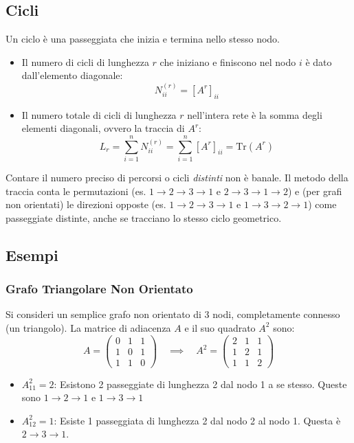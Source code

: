 	\subsection{Cicli}
	Un ciclo è una passeggiata che inizia e termina nello stesso nodo.
	\begin{itemize}
		\item Il numero di cicli di lunghezza $r$ che iniziano e finiscono nel nodo $i$ è dato dall'elemento diagonale:
		$$N_{ii}^{(r)} = [A^r]_{ii}$$
		
		\item Il numero totale di cicli di lunghezza $r$ nell'intera rete è la somma degli elementi diagonali, ovvero la traccia di $A^r$:
		$$L_r = \sum_{i=1}^{n} N_{ii}^{(r)} = \sum_{i=1}^{n} [A^r]_{ii} = \text{Tr}(A^r)$$
	\end{itemize}
	
	Contare il numero preciso di percorsi o cicli \textit{distinti} non è banale. Il metodo della traccia conta le permutazioni (es. $1 \to 2 \to 3 \to 1$ e $2 \to 3 \to 1 \to 2$) e (per grafi non orientati) le direzioni opposte (es. $1 \to 2 \to 3 \to 1$ e $1 \to 3 \to 2 \to 1$) come passeggiate distinte, anche se tracciano lo stesso ciclo geometrico.
	
	\subsection*{Esempi}
	\subsubsection{Grafo Triangolare Non Orientato}
	Si consideri un semplice grafo non orientato di 3 nodi, completamente connesso (un triangolo).
	La matrice di adiacenza $A$ e il suo quadrato $A^2$ sono:
	$$A = \begin{pmatrix} 0 & 1 & 1 \\ 1 & 0 & 1 \\ 1 & 1 & 0 \end{pmatrix} \quad \implies \quad A^2 = \begin{pmatrix} 2 & 1 & 1 \\ 1 & 2 & 1 \\ 1 & 1 & 2 \end{pmatrix}$$
	
	\begin{itemize}
		\item $A^2_{11} = 2$: Esistono 2 passeggiate di lunghezza 2 dal nodo 1 a se stesso. Queste sono $1 \to 2 \to 1$ e $1 \to 3 \to 1$ 
		\item $A^2_{12} = 1$: Esiste 1 passeggiata di lunghezza 2 dal nodo 2 al nodo 1. Questa è $2 \to 3 \to 1$.
	\end{itemize}

